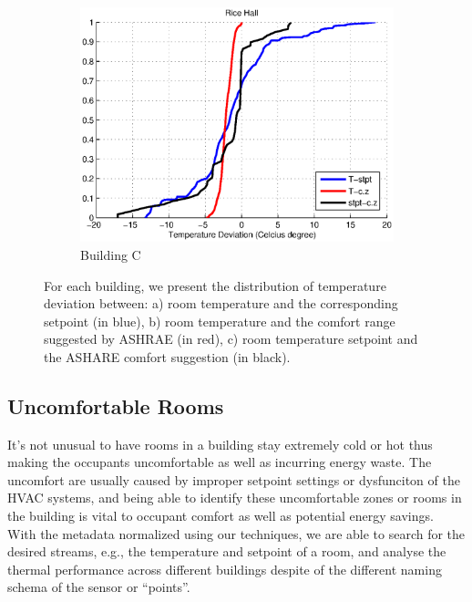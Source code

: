 \begin{figure}[h]
\begin{subfigure}{0.33\textwidth}
		\includegraphics[width=\textwidth]{./figs/Rice_new.eps}
                \caption{Building C}
	\end{subfigure}
\caption{For each building, we present the distribution of temperature deviation between: a) room temperature and the corresponding setpoint (in blue), b) room temperature and the comfort range suggested by ASHRAE (in red), c) room temperature setpoint and the ASHARE comfort suggestion (in black).}
\label{fig:cdf_temp}
\end{figure}

\subsection{Uncomfortable Rooms}
It's not unusual to have rooms in a building stay extremely cold or hot thus making the occupants uncomfortable as well as incurring energy waste. The uncomfort are usually caused by improper setpoint settings or dysfunciton of the HVAC systems, and being able to identify these uncomfortable zones or rooms in the building is vital to occupant comfort as well as potential energy savings. With the metadata normalized using our techniques, we are able to search for the desired streams, e.g., the temperature and setpoint of a room,  and analyse the thermal performance across different buildings despite of the different naming schema of the sensor or ``points''.


